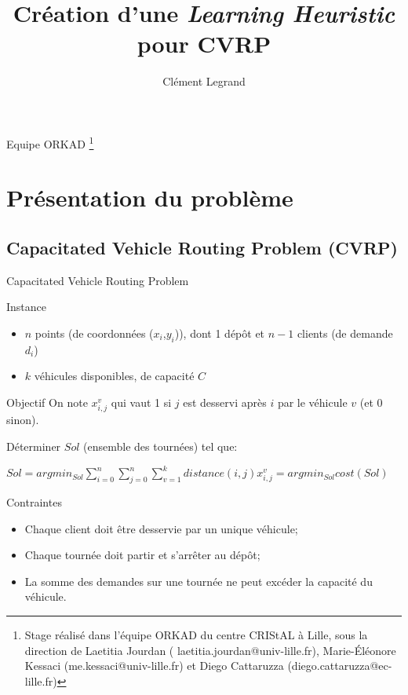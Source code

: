 \documentclass{beamer}
\title{Création d'une \emph{Learning Heuristic} pour CVRP}
\author{Clément Legrand}
\begin{document}
\begin{frame}[plain]
\titlepage
Equipe ORKAD \footnote{Stage réalisé dans l'équipe ORKAD du centre CRIStAL à Lille, sous la direction de Laetitia Jourdan ( laetitia.jourdan@univ-lille.fr), Marie-Éléonore Kessaci (me.kessaci@univ-lille.fr) et Diego Cattaruzza (diego.cattaruzza@ec-lille.fr)}
\end{frame}

\section{Présentation du problème}

\subsection{Capacitated Vehicle Routing Problem (CVRP)}
\footnotesize
\begin{frame}{Capacitated Vehicle Routing Problem}
\begin{block}{Instance}
\begin{itemize}
\item $n$ points (de coordonnées ($x_i$,$y_i$)), dont 1 dépôt et $n-1$ clients (de  demande $d_i$)
\item $k$ véhicules disponibles, de capacité $C$ 
\end{itemize}
\end{block}

\begin{exampleblock}{Objectif}
On note $x_{i,j}^v$ qui vaut 1 si $j$ est desservi après $i$ par le véhicule $v$ (et 0 sinon).

Déterminer $Sol$ (ensemble des tournées) tel que:

\centering
$ Sol = argmin_{Sol} \sum_{i = 0}^{n} \sum_{j = 0}^{n} \sum_{v = 1}^{k} distance(i,j) x_{i,j}^v = argmin_{Sol}cost(Sol)$


\begin{alertblock}{Contraintes}
\begin{itemize}
\item Chaque client doit être desservie par un unique véhicule;
\item Chaque tournée doit partir et s'arrêter au dépôt;
\item La somme des demandes sur une tournée ne peut excéder la capacité du véhicule.
\end{itemize}
\end{alertblock}


\end{exampleblock}
\end{frame}
\end{document}
